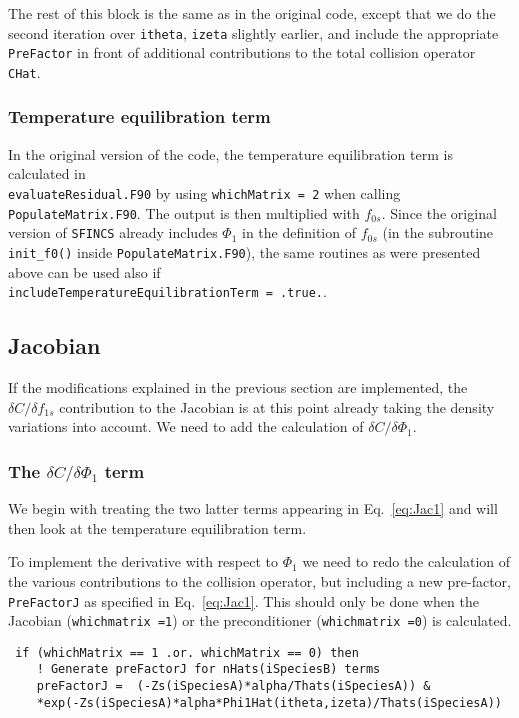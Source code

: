 \documentclass[12pt]{article}
\begin{document}
The rest of this block is the same as in the original code, except that we do the second iteration over \texttt{itheta}, \texttt{izeta} slightly earlier, and include the appropriate \texttt{PreFactor} in front of additional contributions to the total collision operator \texttt{CHat}.

\subsubsection*{Temperature equilibration term}
In the original version of the code, the temperature equilibration term is calculated in \\ \texttt{evaluateResidual.F90} by using \texttt{whichMatrix = 2} when calling \texttt{PopulateMatrix.F90}. The output is then multiplied with $f_{0s}$. Since the original version of \texttt{SFINCS} already includes $\Phi_1$ in the definition of $f_{0s}$ (in the subroutine \texttt{init\_f0()} inside \texttt{PopulateMatrix.F90}), the same routines as were presented above can be used also if\\ \texttt{includeTemperatureEquilibrationTerm = .true.}. 

\subsection*{Jacobian}
 If the modifications explained in the previous section are implemented, the $\delta C/\delta f_{1s}$ contribution to the Jacobian is at this point already taking the density variations into account. We need to add the calculation of $\delta C/\delta \Phi_1$.

\subsubsection*{The $\delta C/\delta \Phi_1$ term}
\label{sec:Jac1}
We begin with treating the two latter terms appearing in Eq.~\eqref{eq:Jac1} and will then look at the temperature equilibration term. 

To implement the derivative with respect to $\Phi_1$ we need to redo the calculation of the various contributions to the collision operator, but including a new pre-factor, \texttt{PreFactorJ} as specified in Eq.~\eqref{eq:Jac1}. This should only be done when the Jacobian (\texttt{whichmatrix =1}) or the preconditioner (\texttt{whichmatrix =0}) is calculated.

\begin{lstlisting}
 if (whichMatrix == 1 .or. whichMatrix == 0) then
    ! Generate preFactorJ for nHats(iSpeciesB) terms              
    preFactorJ =  (-Zs(iSpeciesA)*alpha/Thats(iSpeciesA)) &
    *exp(-Zs(iSpeciesA)*alpha*Phi1Hat(itheta,izeta)/Thats(iSpeciesA))
\end{lstlisting}
\end{document}
